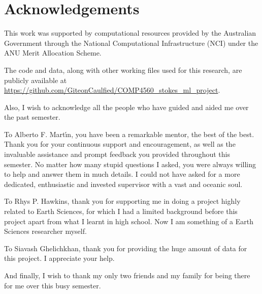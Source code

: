 \chapter*{Acknowledgements}

This work was supported by computational resources provided by the Australian Government through the National Computational Infrastructure (NCI) under the ANU Merit Allocation Scheme.

The code and data, along with other working files used for this research, are publicly available at \url{https://github.com/GiteonCaulfied/COMP4560_stokes_ml_project}.

Also, I wish to acknowledge all the people who have guided and aided me over the past semester.

To Alberto F. Mart\'{\i}n, you have been a remarkable mentor, the best of the best. Thank you for your continuous support and encouragement, as well as the invaluable assistance and prompt feedback you provided throughout this semester. No matter how many stupid questions I asked, you were always willing to help and answer them in much details. I could not have asked for a more dedicated, enthusiastic and invested supervisor with a vast and oceanic soul.

To Rhys P. Hawkins, thank you for supporting me in doing a project highly related to Earth Sciences, for 
which I had a limited background before this project apart from what I learnt in high school. Now I am something of a Earth Sciences researcher myself.

To Siavash Ghelichkhan, thank you for providing the huge amount of data for this project. I appreciate your help.

And finally, I wish to thank my only two friends and my family for being there for me over this busy semester.

